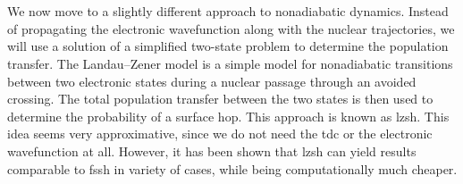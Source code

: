 \section{\filetotitle}\label{sec:landau_zener}
We now move to a slightly different approach to nonadiabatic dynamics. Instead of propagating the electronic wavefunction along with the nuclear trajectories, we will use a solution of a simplified two-state problem to determine the population transfer. The Landau--Zener model is a simple model for nonadiabatic transitions between two electronic states during a nuclear passage through an avoided crossing. The total population transfer between the two states is then used to determine the probability of a surface hop. This approach is known as \acrfull{lzsh}. This idea seems very approximative, since we do not need the \acrshort{tdc} or the electronic wavefunction at all. However, it has been shown that \acrshort{lzsh} can yield results comparable to \acrshort{fssh} in variety of cases, while being computationally much cheaper. \supercite{10.1021/acs.jctc.0c00512}

